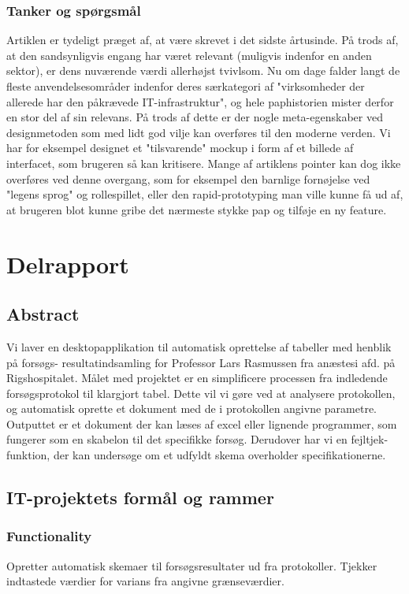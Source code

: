 \documentclass[11pt]{article}
\begin{document}
\subsubsection{Tanker og spørgsmål}
Artiklen er tydeligt præget af, at være skrevet i det sidste årtusinde. På trods af, at den sandsynligvis engang har været relevant (muligvis indenfor en anden sektor), er dens nuværende værdi allerhøjst tvivlsom. Nu om dage falder langt de fleste anvendelsesområder indenfor deres særkategori af "virksomheder der allerede har den påkrævede IT-infrastruktur", og hele paphistorien mister derfor en stor del af sin relevans. På trods af dette er der nogle meta-egenskaber ved designmetoden som med lidt god vilje kan overføres til den moderne verden. Vi har for eksempel designet et "tilsvarende" mockup i form af et billede af interfacet, som brugeren så kan kritisere. Mange af artiklens pointer kan dog ikke overføres ved denne overgang, som for eksempel den barnlige fornøjelse ved "legens sprog" og rollespillet, eller den rapid-prototyping man ville kunne få ud af, at brugeren blot kunne gribe det nærmeste stykke pap og tilføje en ny feature.

\pagebreak
\section{Delrapport}
\subsection{Abstract}
Vi laver en desktopapplikation til automatisk oprettelse af tabeller med henblik på forsøgs- resultatindsamling for Professor Lars Rasmussen fra anæstesi afd. på Rigshospitalet. Målet med projektet er en simplificere processen fra indledende forsøgsprotokol til klargjort tabel. Dette vil vi gøre ved at analysere protokollen, og automatisk oprette et dokument med de i protokollen angivne parametre. Outputtet er et dokument der kan læses af excel eller lignende programmer, som fungerer som en skabelon til  det specifikke forsøg. Derudover har vi en fejltjek-funktion, der kan undersøge om et udfyldt skema overholder specifikationerne. 


\subsection{IT-projektets formål og rammer}
\subsubsection{Functionality}
Opretter automatisk skemaer til forsøgsresultater ud fra protokoller. Tjekker indtastede værdier for varians fra angivne grænseværdier.
\end{document}
